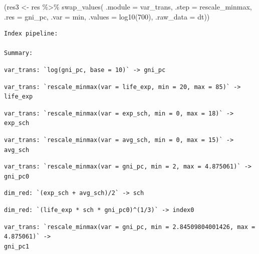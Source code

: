 \documentclass[
]{article}
\newenvironment{Shaded}{\begin{snugshade}}{\end{snugshade}}
\newcommand{\AttributeTok}[1]{\textcolor[rgb]{0.40,0.45,0.13}{#1}}
\newcommand{\DecValTok}[1]{\textcolor[rgb]{0.68,0.00,0.00}{#1}}
\newcommand{\FunctionTok}[1]{\textcolor[rgb]{0.28,0.35,0.67}{#1}}
\newcommand{\NormalTok}[1]{\textcolor[rgb]{0.00,0.23,0.31}{#1}}
\newcommand{\OtherTok}[1]{\textcolor[rgb]{0.00,0.23,0.31}{#1}}
\newcommand{\SpecialCharTok}[1]{\textcolor[rgb]{0.37,0.37,0.37}{#1}}
\begin{document}
\begin{Shaded}
\begin{Highlighting}[]
\NormalTok{(res3 }\OtherTok{\textless{}{-}}\NormalTok{ res }\SpecialCharTok{\%\textgreater{}\%}
  \FunctionTok{swap\_values}\NormalTok{(}
    \AttributeTok{.module =}\NormalTok{ var\_trans, }\AttributeTok{.step =}\NormalTok{ rescale\_minmax, }\AttributeTok{.res =}\NormalTok{ gni\_pc,}
    \AttributeTok{.var =}\NormalTok{ min, }\AttributeTok{.values =} \FunctionTok{log10}\NormalTok{(}\DecValTok{700}\NormalTok{),}
    \AttributeTok{.raw\_data =}\NormalTok{ dt)) }
\end{Highlighting}
\end{Shaded}

\begin{verbatim}
Index pipeline: 

Summary: 
\end{verbatim}

\begin{verbatim}
var_trans: `log(gni_pc, base = 10)` -> gni_pc
\end{verbatim}

\begin{verbatim}
var_trans: `rescale_minmax(var = life_exp, min = 20, max = 85)` -> life_exp
\end{verbatim}

\begin{verbatim}
var_trans: `rescale_minmax(var = exp_sch, min = 0, max = 18)` -> exp_sch
\end{verbatim}

\begin{verbatim}
var_trans: `rescale_minmax(var = avg_sch, min = 0, max = 15)` -> avg_sch
\end{verbatim}

\begin{verbatim}
var_trans: `rescale_minmax(var = gni_pc, min = 2, max = 4.875061)` -> gni_pc0
\end{verbatim}

\begin{verbatim}
dim_red: `(exp_sch + avg_sch)/2` -> sch
\end{verbatim}

\begin{verbatim}
dim_red: `(life_exp * sch * gni_pc0)^(1/3)` -> index0
\end{verbatim}

\begin{verbatim}
var_trans: `rescale_minmax(var = gni_pc, min = 2.84509804001426, max = 4.875061)` ->
gni_pc1
\end{verbatim}
\end{document}
